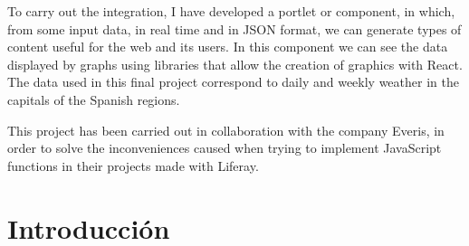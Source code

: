 \documentclass[a4paper, 12pt]{book}
\begin{document}
\vspace{5mm}
To carry out the integration, I have developed a portlet or component, in which, from some input data, in real time and in JSON format, we can generate types of content useful for the web and its users. In this component we can see the data displayed by graphs using libraries that allow the creation of graphics with React. The data used in this final project correspond to daily and weekly weather in the capitals of the Spanish regions.

\vspace{5mm}
This project has been carried out in collaboration with the company Everis, in order to solve the inconveniences caused when trying to implement JavaScript functions in their projects made with Liferay.







\tableofcontents 
\cleardoublepage
\listoffigures %




\cleardoublepage
\chapter{Introducci\'on}
\label{sec:intro} %
\end{document}
